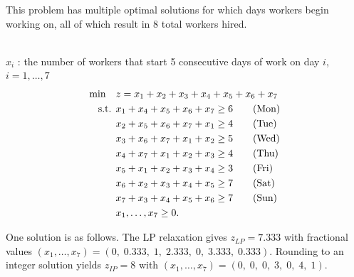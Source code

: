 \begin{solution} This problem has multiple optimal solutions for which days workers begin working on, all of which result in 8 total workers hired.

 \\
$x_i$ : the number of workers that start 5 consecutive days of work on day $i$, $ i = 1,\dots,7$ \\
\smallskip {}
\begin{align*}
\min \quad & z = x_1 + x_2 + x_3 + x_4 + x_5 + x_6 + x_7 \\
\text{ s.t. }        & x_1 + x_4 + x_5 + x_6 + x_7 \ge 6   \tag{Mon} \\
& x_2 + x_5 + x_6 + x_7 + x_1 \ge 4   \tag{Tue} \\
& x_3 + x_6 + x_7 + x_1 + x_2 \ge 5   \tag{Wed} \\
& x_4 + x_7 + x_1 + x_2 + x_3 \ge 4   \tag{Thu} \\
& x_5 + x_1 + x_2 + x_3 + x_4 \ge 3   \tag{Fri} \\
& x_6 + x_2 + x_3 + x_4 + x_5 \ge 7   \tag{Sat} \\
& x_7 + x_3 + x_4 + x_5 + x_6 \ge 7   \tag{Sun} \\
& x_1, \dots, x_7 \ge 0.
\end{align*}

One solution is as follows. The LP relaxation gives $z_{LP} = 7.333$ with fractional values $(x_1, \dots, x_7) = (0,\; 0.333,\; 1,\; 2.333,\; 0,\; 3.333,\; 0.333)$. Rounding to an integer solution yields $z_{IP} = 8$ with $(x_1, \dots, x_7) = (0,\; 0,\; 0,\; 3,\; 0,\; 4,\; 1)$.
\end{solution}

